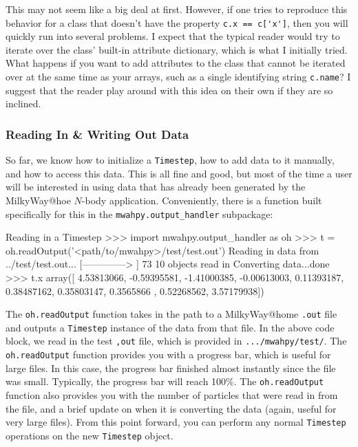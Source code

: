 \documentclass{article}
\begin{document}
This may not seem like a big deal at first. However, if one tries to reproduce this behavior for a class that doesn't have the property \verb!c.x == c['x']!, then you will quickly run into several problems. I expect that the typical reader would try to iterate over the class' built-in attribute dictionary, which is what I initially tried. What happens if you want to add attributes to the class that cannot be iterated over at the same time as your arrays, such as a single identifying string \verb!c.name!? I suggest that the reader play around with this idea on their own if they are so inclined. 

\subsubsection{Reading In \& Writing Out Data}

So far, we know how to initialize a \verb!Timestep!, how to add data to it manually, and how to access this data. This is all fine and good, but most of the time a user will be interested in using data that has already been generated by the MilkyWay@hoe $N$-body application. Conveniently, there is a \mwahpy function built specifically for this in the \verb!mwahpy.output_handler! subpackage: \\

\begin{codelisting}{Reading in a Timestep}
>>> import mwahpy.output_handler as oh
>>> t = oh.readOutput('<path/to/mwahpy>/test/test.out')
Reading in data from ../test/test.out...
[-------------->     ] 73%
10 objects read in
Converting data...done
>>> t.x
array([ 4.53813066, -0.59395581, -1.41000385, -0.00613003,  0.11393187,
        0.38487162,  0.35803147,  0.3565866 ,  0.52268562, 3.57179938])
\end{codelisting}

The \verb!oh.readOutput! function takes in the path to a MilkyWay@home \verb!.out! file and outputs a \verb!Timestep! instance of the data from that file. In the above code block, we read in the test \verb!,out! file, which is provided in \verb!.../mwahpy/test/!. The \verb!oh.readOutput! function provides you with a progress bar, which is useful for large files. In this case, the progress bar finished almost instantly since the file was small. Typically, the progress bar will reach 100\%. The \verb!oh.readOutput! function also provides you with the number of particles that were read in from the file, and a brief update on when it is converting the data (again, useful for very large files). From this point forward, you can perform any normal \verb!Timestep! operations on the new \verb!Timestep! object. 
\end{document}
